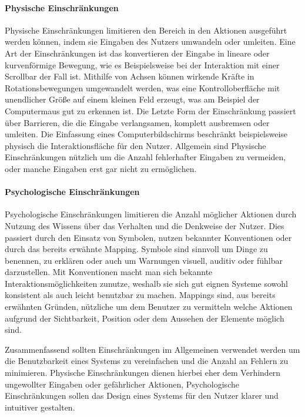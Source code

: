 \paragraph{Physische Einschränkungen}
Physische Einschränkungen limitieren den Bereich in den Aktionen ausgeführt werden können, indem sie Eingaben des Nutzers umwandeln oder umleiten.
Eine Art der Einschränkungen ist das konvertieren der Eingabe in lineare oder kurvenförmige Bewegung, wie es Beispielsweise bei der Interaktion mit einer Scrollbar der Fall ist.
Mithilfe von Achsen können wirkende Kräfte in Rotationsbewegungen umgewandelt werden, was eine Kontrolloberfläche mit unendlicher Größe auf einem kleinen Feld erzeugt, was am Beispiel der Computermaus gut zu erkennen ist.
Die Letzte Form der Einschränkung passiert über Barrieren, die die Eingabe verlangsamen, komplett ausbremsen oder umleiten. Die Einfassung eines Computerbildschirms beschränkt beispielsweise physisch die Interaktionsfläche für den Nutzer.
Allgemein sind Physische Einschränkungen nützlich um die Anzahl fehlerhafter Eingaben zu vermeiden, oder manche Eingaben erst gar nicht zu ermöglichen\cite{Norman.2016}.

\paragraph{Psychologische Einschränkungen}
Psychologische Einschränkungen limitieren die Anzahl möglicher Aktionen durch Nutzung des Wissens über das Verhalten und die Denkweise der Nutzer.
Dies passiert durch den Einsatz von Symbolen, nutzen bekannter Konventionen oder durch das bereits erwähnte Mapping.
Symbole sind sinnvoll um Dinge zu benennen, zu erklären oder auch um Warnungen visuell, auditiv oder fühlbar darzustellen.
Mit Konventionen macht man sich bekannte Interaktionsmöglichkeiten zunutze, weshalb sie sich gut eignen Systeme sowohl konsistent als auch leicht benutzbar zu machen.
Mappings sind, aus bereits erwähnten Gründen, nützliche um dem Benutzer zu vermitteln welche Aktionen aufgrund der Sichtbarkeit, Position oder dem Aussehen der Elemente möglich sind\cite{Norman.2016}.

Zusammenfassend sollten Einschränkungen im Allgemeinen verwendet werden um die Benutzbarkeit eines Systems zu vereinfachen und die Anzahl an Fehlern zu minimieren. Physische Einschränkungen dienen hierbei eher dem Verhindern ungewollter Eingaben oder gefährlicher Aktionen, Psychologische Einschränkungen sollen das Design eines Systems für den Nutzer klarer und intuitiver gestalten.

